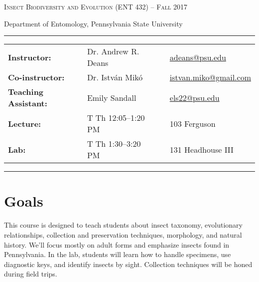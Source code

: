 \documentclass[11pt]{article}
\begin{document}
\begin{center}
{\huge \textsc{Insect Biodiversity and Evolution (ENT 432) -- Fall 2017}}
\end{center}
\begin{center}
Department of Entomology, Pennsylvania State University\end{center}

\begin{center}
\rule{6in}{0.4pt}
\begin{minipage}[t]{.74\textwidth}
\begin{tabular}{llcl}
\textbf{Instructor:} & Dr. Andrew R. Deans & &  \href{mailto:adeans@psu.edu}{adeans@psu.edu} \\
\textbf{Co-instructor:} & Dr. Istv\'an Mik\'o & &  \href{mailto:istvan.miko@gmail.com}{istvan.miko@gmail.com} \\
\textbf{Teaching Assistant:} & Emily Sandall & &  \href{mailto:els22@psu.edu}{els22@psu.edu} \\
\textbf{Lecture:} & T Th 12:05--1:20 PM & & 103 Ferguson \\
\textbf{Lab:} & T Th 1:30--3:20 PM & & 131 Headhouse III \\
\end{tabular}
\end{minipage}
\rule{6in}{0.4pt}
\end{center}
\vspace{.3cm}
\setlength{\unitlength}{1in}
\renewcommand{\arraystretch}{2}

\section*{Goals} 
This course is designed to teach students about insect taxonomy, evolutionary relationships, collection and preservation techniques, morphology, and natural history. We'll focus mostly on adult forms and emphasize insects found in Pennsylvania. In the lab, students will learn how to handle specimens, use diagnostic keys, and identify insects by sight. Collection techniques will be honed during field trips.
\end{document}
